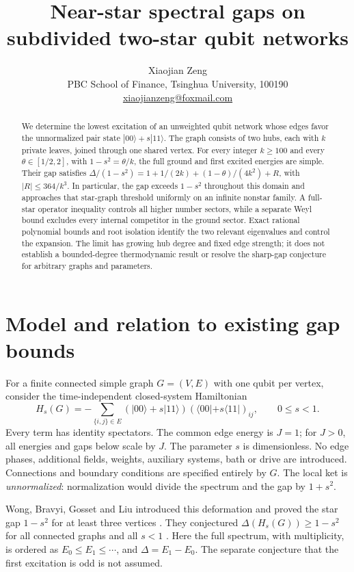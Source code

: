 \documentclass[11pt]{article}
\title{Near-star spectral gaps on subdivided two-star qubit networks}
\author{Xiaojian Zeng\\[2pt]
\small PBC School of Finance, Tsinghua University, 100190\\
\small \href{mailto:xiaojianzeng@foxmail.com}{xiaojianzeng@foxmail.com}}
\date{}
\newcommand{\ket}[1]{|#1\rangle}
\newcommand{\bra}[1]{\langle#1|}
\begin{document}
\maketitle
\begin{abstract}
We determine the lowest excitation of an unweighted qubit network whose
edges favor the unnormalized pair state $\ket{00}+s\ket{11}$. The graph
consists of two hubs, each with $k$ private leaves, joined through one
shared vertex. For every integer $k\geq100$ and every
$\theta\in[1/2,2]$, with $1-s^2=\theta/k$, the full ground and first
excited energies are simple. Their gap satisfies
$\Delta/(1-s^2)=1+1/(2k)+(1-\theta)/(4k^2)+R$, with
$|R|\leq364/k^3$. In particular, the gap exceeds $1-s^2$ throughout
this domain and approaches that star-graph threshold uniformly on an
infinite nonstar family. A full-star operator inequality controls all
higher number sectors, while a separate Weyl bound excludes every
internal competitor in the ground sector. Exact rational polynomial
bounds and root isolation identify the two relevant eigenvalues and
control the expansion. The limit has growing hub degree and fixed edge
strength; it does not establish a bounded-degree thermodynamic result
or resolve the sharp-gap conjecture for arbitrary graphs and parameters.
\end{abstract}

\section{Model and relation to existing gap bounds}

For a finite connected simple graph $G=(V,E)$ with one qubit per vertex,
consider the time-independent closed-system Hamiltonian
\begin{equation}
 H_s(G)=-\sum_{\{i,j\}\in E}
 (\ket{00}+s\ket{11})(\bra{00}+s\bra{11})_{ij},
 \qquad 0\leq s<1 .
 \label{eq:model}
\end{equation}
Every term has identity spectators. The common edge energy is $J=1$;
for $J>0$, all energies and gaps below scale by $J$. The parameter $s$
is dimensionless. No edge phases, additional fields, weights, auxiliary
systems, bath or drive are introduced. Connections and boundary
conditions are specified entirely by $G$. The local ket is
\emph{unnormalized}: normalization would divide the spectrum and the
gap by $1+s^2$.

Wong, Bravyi, Gosset and Liu introduced this deformation and proved the
star gap $1-s^2$ for at least three vertices
\cite[Section 5.5, Lemma 13]{Wong2026}. They conjectured
$\Delta(H_s(G))\geq1-s^2$ for all connected graphs and all $s<1$
\cite[Conjecture 3]{Wong2026}. Here the full spectrum, with
multiplicity, is ordered as $E_0\leq E_1\leq\cdots$, and
$\Delta=E_1-E_0$. The separate conjecture that the first excitation is
odd is not assumed.
\end{document}
